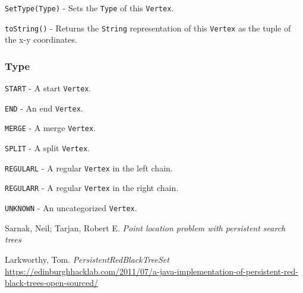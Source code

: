 \documentclass[11pt]{article}
\begin{document}
\texttt{SetType(Type)} - Sets the \texttt{Type} of this \texttt{Vertex}.

\texttt{toString()} - Returns the \texttt{String} representation of this \texttt{Vertex} as the tuple of the x-y coordinates.

\subsubsection{Type}
\label{sec:verttype}

\texttt{START} - A start \texttt{Vertex}.

\texttt{END} - An end \texttt{Vertex}.

\texttt{MERGE} - A merge \texttt{Vertex}.

\texttt{SPLIT} - A split \texttt{Vertex}.

\texttt{REGULARL} - A regular \texttt{Vertex} in the left chain.

\texttt{REGULARR} - A regular \texttt{Vertex} in the right chain.

\texttt{UNKNOWN} - An uncategorized \texttt{Vertex}.

\begin{thebibliography}{9}
	Sarnak, Neil; Tarjan, Robert E.
	\textit{Point location problem with persistent search trees}
	
	Larkworthy, Tom.
	\textit{PersistentRedBlackTreeSet}
	\url{https://edinburghhacklab.com/2011/07/a-java-implementation-of-persistent-red-black-trees-open-sourced/}
\end{thebibliography}
\end{document}
